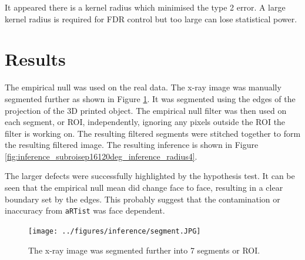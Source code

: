 \documentclass[twocolumn]{article}
\begin{document}
It appeared there is a kernel radius which minimised the type 2 error. A large kernel radius is required for FDR control but too large can lose statistical power.

\section{Results}

The empirical null was used on the real data. The x-ray image was manually segmented further as shown in Figure \ref{fig:inference_segmentFurther}. It was segmented using the edges of the projection of the 3D printed object. The empirical null filter was then used on each segment, or ROI, independently, ignoring any pixels outside the ROI the filter is working on. The resulting filtered segments were stitched together to form the resulting filtered image. The resulting inference is shown in Figure \ref{fig:inference_subroisep16120deg_inference_radius4}. 

The larger defects were successfully highlighted by the hypothesis test. It can be seen that the empirical null mean did change face to face, resulting in a clear boundary set by the edges. This probably suggest that the contamination or inaccuracy from \texttt{aRTist} was face dependent.

\begin{figure}
  \centering
  \texttt{[image: ../figures/inference/segment.JPG]}
  \caption{The x-ray image was segmented further into 7 segments or ROI.}
  \label{fig:inference_segmentFurther}
\end{figure}
\end{document}
